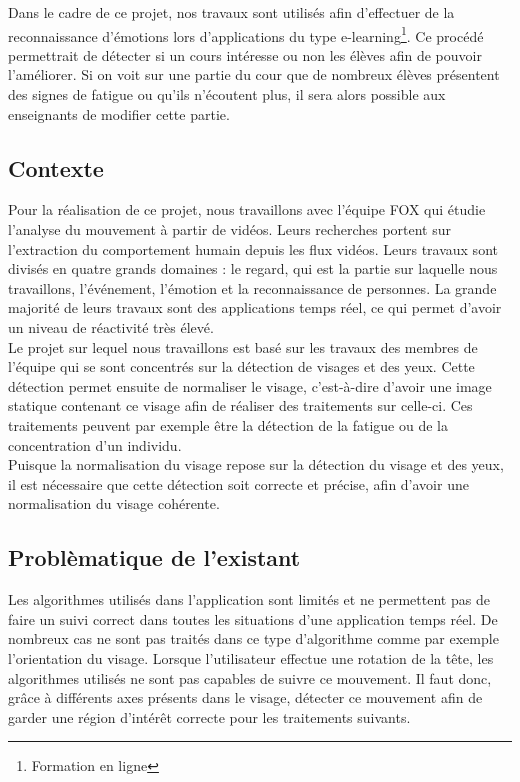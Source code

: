 Dans le cadre de ce projet, nos travaux sont utilisés afin d'effectuer de la reconnaissance d'émotions lors d'applications
du type e-learning\footnote{Formation en ligne}. Ce procédé permettrait de détecter si un cours 
intéresse ou non les élèves afin de pouvoir l'améliorer. Si on voit sur une partie du cour
que de nombreux élèves présentent des signes de fatigue ou qu'ils n'écoutent plus, il sera
alors possible aux enseignants de modifier cette partie.\\


\subsection{Contexte}
Pour la réalisation de ce projet, nous travaillons avec l'équipe FOX qui étudie
l'analyse du mouvement à partir de vidéos. Leurs recherches portent
sur l'extraction du comportement humain depuis les flux vidéos.  Leurs travaux sont
divisés en quatre grands domaines : le regard, qui est la partie sur laquelle nous travaillons, l'événement, l'émotion et la
reconnaissance de personnes. La grande majorité de leurs travaux sont
des applications temps réel, ce qui permet d'avoir un niveau de réactivité très élevé.\\ 

Le projet sur lequel nous travaillons est basé sur les travaux des membres de l'équipe qui se sont concentrés sur la
détection de visages et des yeux. Cette détection permet ensuite de normaliser le visage, c'est-à-dire
d'avoir une image statique contenant ce visage afin de réaliser des traitements sur celle-ci. Ces
traitements peuvent par exemple être la détection de la fatigue ou de la concentration d'un individu.\\

Puisque la normalisation du visage repose sur la détection du visage et des yeux, il est nécessaire que cette 
détection soit correcte et précise, afin d'avoir une normalisation du visage cohérente.\\

\subsection{Problèmatique de l'existant}
Les algorithmes utilisés dans l'application sont limités et ne permettent pas de faire un suivi correct
dans toutes les situations d'une application temps réel. De nombreux cas ne sont
pas traités dans ce type d'algorithme comme par exemple l'orientation du visage. Lorsque
l'utilisateur effectue une rotation de la tête, les algorithmes utilisés ne sont pas capables
de suivre ce mouvement. Il faut donc, grâce à différents axes présents dans le visage, détecter
ce mouvement afin de garder une région d'intérêt correcte pour les traitements suivants.\\

